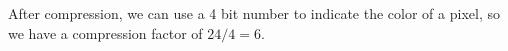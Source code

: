 \begin{answer}
    After compression, we can use a 4 bit number to indicate the color of a pixel, so
    we have a compression factor of $24/4 = 6$.
\end{answer}
